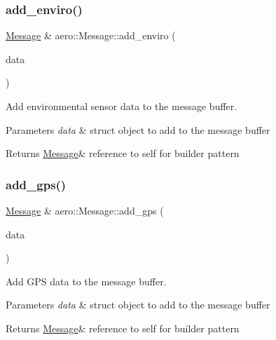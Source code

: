 \subsubsection{\texorpdfstring{add\+\_\+enviro()}{add\_enviro()}}
{\footnotesize\ttfamily \hyperlink{classaero_1_1Message}{Message} \& aero\+::\+Message\+::add\+\_\+enviro (\begin{DoxyParamCaption}\item[{const Enviro \&}]{data }\end{DoxyParamCaption})}



Add environmental sensor data to the message buffer. 


\begin{DoxyParams}{Parameters}
{\em data} & struct object to add to the message buffer \\
\hline
\end{DoxyParams}
\begin{DoxyReturn}{Returns}
\hyperlink{classaero_1_1Message}{Message}\& reference to self for builder pattern 
\end{DoxyReturn}
\mbox{\label{classaero_1_1Message_a2da23dcc2855e77e39f9dd2306e773a3}} 
\subsubsection{\texorpdfstring{add\+\_\+gps()}{add\_gps()}}
{\footnotesize\ttfamily \hyperlink{classaero_1_1Message}{Message} \& aero\+::\+Message\+::add\+\_\+gps (\begin{DoxyParamCaption}\item[{const G\+PS \&}]{data }\end{DoxyParamCaption})}



Add G\+PS data to the message buffer. 


\begin{DoxyParams}{Parameters}
{\em data} & struct object to add to the message buffer \\
\hline
\end{DoxyParams}
\begin{DoxyReturn}{Returns}
\hyperlink{classaero_1_1Message}{Message}\& reference to self for builder pattern 
\end{DoxyReturn}
\mbox{\label{classaero_1_1Message_a88dbae0c7efc25c6cba13c8448d1b4a1}} 
